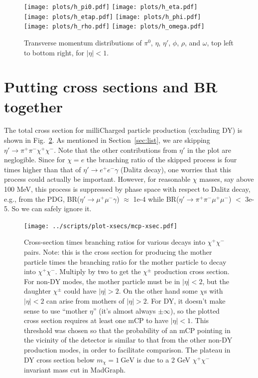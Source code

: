 \documentclass[12pt]{article}
\begin{document}
\begin{figure}
  \centering
  \texttt{[image: plots/h\_pi0.pdf]}
  \texttt{[image: plots/h\_eta.pdf]} \\
  \texttt{[image: plots/h\_etap.pdf]}
  \texttt{[image: plots/h\_phi.pdf]} \\
  \texttt{[image: plots/h\_rho.pdf]}
  \texttt{[image: plots/h\_omega.pdf]} \\
  \caption{\protect Transverse momentum distributions of 
$\pi^0$, $\eta$, $\eta'$, $\phi$, $\rho$, and $\omega$, top left
to bottom right, for $|\eta| < 1$.}
\label{fig:mesons}
\end{figure}

\clearpage


\section{Putting cross sections and BR together}
\label{sec:bottom-line}

The total cross section for milliCharged particle production (excluding
DY) is shown in Fig.~\ref{fig:total-rates}.  
As mentioned in
Section~\ref{sec:list}, we are skipping $\eta' \to \pi^+ \pi^- \chi^+
\chi^-$.
Note that the other contributions from $\eta'$ in the plot are neglogible.
Since for $\chi = e$ the branching ratio of the skipped process is four
times higher than
that of $\eta' \to e^+ e^- \gamma$ (Dalitz decay), one worries that
this
process could actually be important.  However, for reasonable $\chi$
masses, say above 100 MeV, this process is suppressed by phase space
with respect to Dalitz decay, e.g., from the PDG,
BR($\eta' \to \mu^+ \mu^- \gamma$) $\approx$ 1e-4 while
BR($\eta' \to \pi^+ \pi^- \mu^+ \mu^-$) $<$ 3e-5.  So we can safely ignore it.


\begin{figure}
  \begin{center}
  \texttt{[image: ../scripts/plot-xsecs/mcp-xsec.pdf]}
  \caption{\protect Cross-section times branching ratios for various
    decays into $\chi^+ \chi^-$ pairs.  Note: this is
    the cross section for producing the mother particle times the
    branching ratio for the mother particle to decay into $\chi^+ \chi^-$.
    Multiply by two to get the $\chi^{\pm}$ production cross section.
    For non-DY modes, the mother particle must be in $|\eta|<2$, but the
    daughter $\chi^{\pm}$ could have $|\eta|>2$.  On the other hand some
    $\chi$s with $|\eta|<2$ can arise from mothers of $|\eta|>2$. For DY,
    it doesn't make sense to use ``mother $\eta$'' (it's almost always $\pm\infty$), 
    so the plotted cross section requires at least one mCP to have $|\eta|<1$. 
    This threshold was chosen so that the probability of an mCP pointing in the vicinity of 
    the detector is similar to that from the other non-DY production modes, 
    in order to facilitate comparison. The plateau in DY cross section below 
    $m_\chi=1~\text{GeV}$ is due to a 2 GeV $\chi^+\chi^-$ invariant mass cut in MadGraph.}
\label{fig:total-rates}
\end{center}
  \end{figure}
\end{document}
